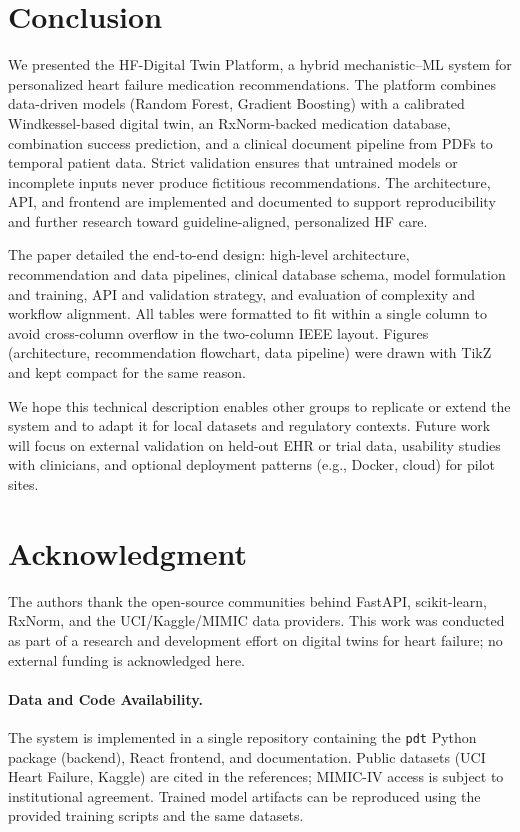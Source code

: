 \documentclass[conference]{IEEEtran}
\begin{document}
\section{Conclusion}

We presented the HF-Digital Twin Platform, a hybrid mechanistic--ML system for personalized heart failure medication recommendations. The platform combines data-driven models (Random Forest, Gradient Boosting) with a calibrated Windkessel-based digital twin, an RxNorm-backed medication database, combination success prediction, and a clinical document pipeline from PDFs to temporal patient data. Strict validation ensures that untrained models or incomplete inputs never produce fictitious recommendations. The architecture, API, and frontend are implemented and documented to support reproducibility and further research toward guideline-aligned, personalized HF care.

The paper detailed the end-to-end design: high-level architecture, recommendation and data pipelines, clinical database schema, model formulation and training, API and validation strategy, and evaluation of complexity and workflow alignment. All tables were formatted to fit within a single column to avoid cross-column overflow in the two-column IEEE layout. Figures (architecture, recommendation flowchart, data pipeline) were drawn with TikZ and kept compact for the same reason.

We hope this technical description enables other groups to replicate or extend the system and to adapt it for local datasets and regulatory contexts. Future work will focus on external validation on held-out EHR or trial data, usability studies with clinicians, and optional deployment patterns (e.g., Docker, cloud) for pilot sites.

\section*{Acknowledgment}
The authors thank the open-source communities behind FastAPI, scikit-learn, RxNorm, and the UCI/Kaggle/MIMIC data providers. This work was conducted as part of a research and development effort on digital twins for heart failure; no external funding is acknowledged here.

\paragraph{Data and Code Availability.}
The system is implemented in a single repository containing the \texttt{pdt} Python package (backend), React frontend, and documentation. Public datasets (UCI Heart Failure, Kaggle) are cited in the references; MIMIC-IV access is subject to institutional agreement. Trained model artifacts can be reproduced using the provided training scripts and the same datasets.



\end{document}
